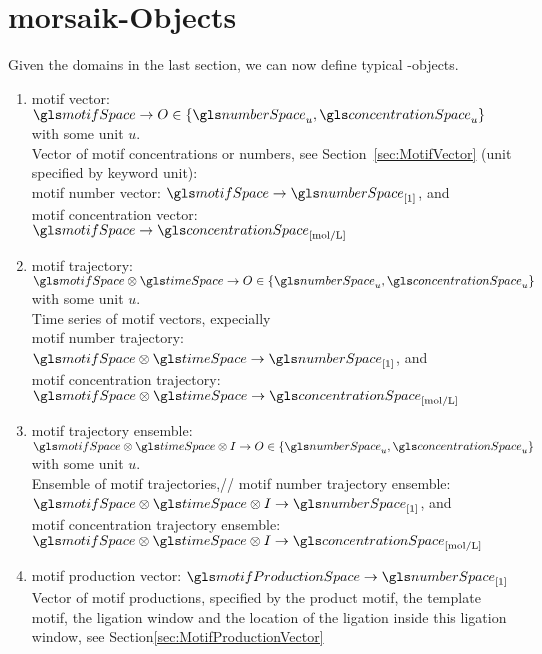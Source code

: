 \chapter{morsaik-Objects}

Given the domains in the last section,
we can now define typical -objects.
\begin{enumerate}
    \item motif vector: $\motifSpace \rightarrow O \in \{\numberSpace_{u}, \concentrationSpace_u\}$ with some unit $u$.\\
        Vector of motif concentrations or numbers,
        see Section~\ref{sec:MotifVector}
        (unit specified by keyword unit):\\
        motif number vector: $\motifSpace \rightarrow \numberSpace_{[1]}$, and\\
        motif concentration vector: $\motifSpace \rightarrow \concentrationSpace_{[\mathrm{mol}/\mathrm{L}]}$
    \item motif trajectory: $\motifSpace \otimes \timeSpace \rightarrow O \in \{\numberSpace_{u}, \concentrationSpace_u\}$ with some unit $u$.\\
        Time series of motif vectors, expecially\\
        motif number trajectory: $\motifSpace \otimes \timeSpace \rightarrow \numberSpace_{[1]}$, and\\
        motif concentration trajectory: $\motifSpace \otimes \timeSpace \rightarrow \concentrationSpace_{[\mathrm{mol}/\mathrm{L}]}$
    \item motif trajectory ensemble: $\motifSpace \otimes \timeSpace \otimes \Idx \rightarrow O \in \{\numberSpace_{u}, \concentrationSpace_u\}$ with some unit $u$.\\
        Ensemble of motif trajectories,//
        motif number trajectory ensemble: $\motifSpace \otimes \timeSpace \otimes \Idx \rightarrow \numberSpace_{[1]}$, and\\
        motif concentration trajectory ensemble: $\motifSpace \otimes \timeSpace \otimes \Idx \rightarrow \concentrationSpace_{[\mathrm{mol}/\mathrm{L}]}$
    \item motif production vector: $\motifProductionSpace \rightarrow \numberSpace_{[1]}$\\
        Vector of motif productions,
        specified by the product motif,
        the template motif,
        the ligation window and
        the location of the ligation inside this ligation window,
        see Section\ref{sec:MotifProductionVector}

\end{enumerate}
